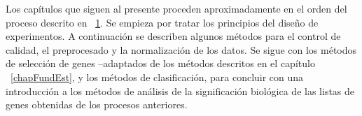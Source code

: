 \vspace{-0.5cm}
\begin{figure}[!h]
\label{c04preferredAnalysisMethods}
\end{figure}

Los cap\'itulos que siguen al presente proceden aproximadamente en el orden del proceso descrito en ~\ref{c04preferredAnalysisMethods}.
Se empieza por tratar los principios del dise\~no de experimentos.
A continuaci\'on se describen algunos m\'etodos para el control de calidad, el preprocesado y la normalizaci\'on de los datos.
Se sigue con los m\'etodos de selecci\'on de genes --adaptados de los m\'etodos descritos en el cap\'itulo ~\ref{chapFundEst}, y los m\'etodos de
clasificaci\'on, para concluir con una introducci\'on a los m\'etodos de an\'alisis de la significaci\'on biol\'ogica de las listas de genes obtenidas
de los procesos anteriores.

